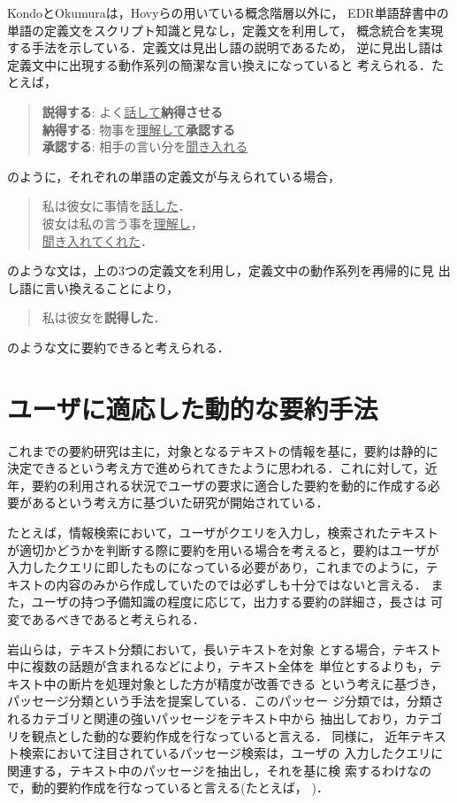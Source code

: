KondoとOkumura\cite{kondo:97:a}は，Hovyらの用いている概念階層以外に，
EDR単語辞書中の単語の定義文をスクリプト知識と見なし，定義文を利用して，
概念統合を実現する手法を示している．定義文は見出し語の説明であるため，
逆に見出し語は定義文中に出現する動作系列の簡潔な言い換えになっていると
考えられる．たとえば，
\begin{quote}
{\bf 説得する}: よく\underline{話して}{\bf 納得させる}\\
{\bf 納得する}: 物事を\underline{理解して}{\bf 承認する}\\
{\bf 承認する}: 相手の言い分を\underline{聞き入れる}
\end{quote}
のように，それぞれの単語の定義文が与えられている場合，
\begin{quote}
私は彼女に事情を\underline{話した}．\\
彼女は私の言う事を\underline{理解し}，\\
\underline{聞き入れてくれた}．
\end{quote}
のような文は，上の3つの定義文を利用し，定義文中の動作系列を再帰的に見
出し語に言い換えることにより，
\begin{quote}
私は彼女を{\bf 説得した}．
\end{quote}
のような文に要約できると考えられる．

\section{ユーザに適応した動的な要約手法}

これまでの要約研究は主に，対象となるテキストの情報を基に，要約は静的に
決定できるという考え方で進められてきたように思われる．これに対して，近
年，要約の利用される状況でユーザの要求に適合した要約を動的に作成する必
要があるという考え方に基づいた研究が開始されている\cite{ochitani:97:a}．

たとえば，情報検索において，ユーザがクエリを入力し，検索されたテキスト
が適切かどうかを判断する際に要約を用いる場合を考えると，要約はユーザが
入力したクエリに即したものになっている必要があり，これまでのように，テ
キストの内容のみから作成していたのでは必ずしも十分ではないと言える．
また，ユーザの持つ予備知識の程度に応じて，出力する要約の詳細さ，長さは
可変であるべきであると考えられる．

岩山ら\cite{iwayama:99:a}は，テキスト分類において，長いテキストを対象
とする場合，テキスト中に複数の話題が含まれるなどにより，テキスト全体を
単位とするよりも，テキスト中の断片を処理対象とした方が精度が改善できる
という考えに基づき，パッセージ分類という手法を提案している．このパッセー
ジ分類では，分類されるカテゴリと関連の強いパッセージをテキスト中から
抽出しており，カテゴリを観点とした動的な要約作成を行なっていると言える．
同様に，
近年テキスト検索において注目されているパッセージ検索は，ユーザの
入力したクエリに関連する，テキスト中のパッセージを抽出し，それを基に検
索するわけなので，動的要約作成を行なっていると言える(たとえば，
\cite{mochizuki:99:b})．

